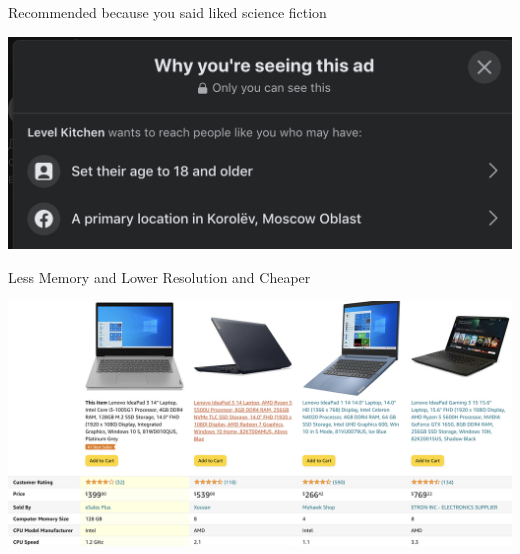 \documentclass[11pt,aspectratio=169,handout]{beamer}
\begin{document}
\begin{frame}

\begin{tcolorbox}[colback=info!5,colframe=info!80,title=Content-based]
Recommended because you said liked science fiction
\end{tcolorbox}

\vfill

\begin{center}
\includegraphics[scale=0.3]{images/facebook.png}
\end{center}

\end{frame}

\begin{frame}

\begin{tcolorbox}[colback=info!5,colframe=info!80,title=Knowledge-based]
Less Memory and Lower Resolution and Cheaper
\end{tcolorbox}

\vfill

\begin{center}
\includegraphics[scale=0.2]{images/amazon2.png}
\end{center}

\end{frame}
\end{document}

